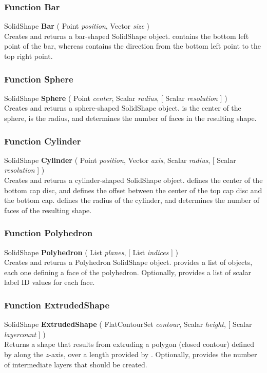 \subsubsection{Function Bar \label{F:Bar}}
SolidShape \textbf{Bar} ( Point \textit{position}, Vector \textit{size} ) \\
Creates and returns a bar-shaped SolidShape object.  contains the bottom left point of the bar, whereas  contains the direction from the bottom left point to the top right point.

\subsubsection{Function Sphere \label{F:Sphere}}
SolidShape \textbf{Sphere} ( Point \textit{center}, Scalar \textit{radius},  [ Scalar \textit{resolution} ] ) \\
Creates and returns a sphere-shaped SolidShape object.  is the center of the sphere,  is the radius, and  determines the number of faces in the resulting shape.

\subsubsection{Function Cylinder \label{F:Cylinder}}
SolidShape \textbf{Cylinder} ( Point \textit{position}, Vector \textit{axis}, Scalar \textit{radius},  [ Scalar \textit{resolution} ] ) \\
Creates and returns a cylinder-shaped SolidShape object.  defines the center of the bottom cap disc, and  defines the offset between the center of the top cap disc and the bottom cap.  defines the radius of the cylinder, and  determines the number of faces of the resulting shape.

\subsubsection{Function Polyhedron \label{F:Polyhedron}}
SolidShape \textbf{Polyhedron} ( List \textit{planes},  [ List \textit{indices} ] ) \\
Creates and returns a Polyhedron SolidShape object.  provides a list of  objects, each one defining a face of the polyhedron. Optionally,  provides a list of scalar label ID values for each face.

\subsubsection{Function ExtrudedShape \label{F:ExtrudedShape}}
SolidShape \textbf{ExtrudedShape} ( FlatContourSet \textit{contour}, Scalar \textit{height},  [ Scalar \textit{layercount} ] ) \\
Returns a shape that results from extruding a polygon (closed contour) defined by  along the $z$-axis, over a length provided by . Optionally,  provides the number of intermediate layers that should be created.

